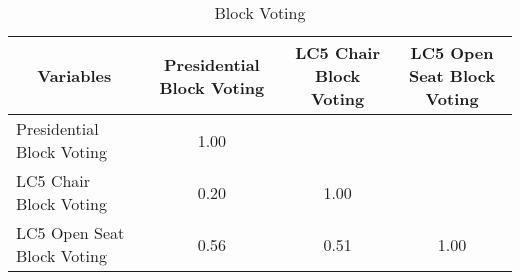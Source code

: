 \begin{table}[htbp]\centering \caption{Block Voting\label{corrtable}}
\begin{tabular}{l  c  c  c }\hline\hline
\multicolumn{1}{c}{Variables} &Presidential Block Voting&LC5 Chair Block Voting&LC5 Open Seat Block Voting\\ \hline
Presidential Block Voting&1.00\\
LC5 Chair Block Voting&0.20&1.00\\
LC5 Open Seat Block Voting&0.56&0.51&1.00\\
\hline \hline 
 \end{tabular}
\end{table}
